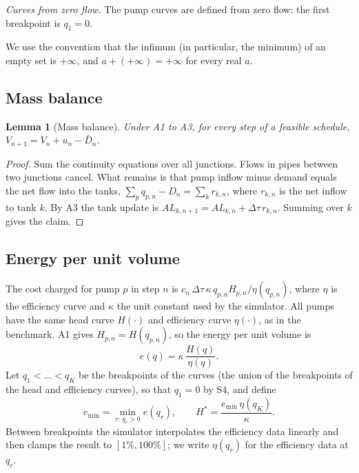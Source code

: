 \documentclass[11pt]{article}
\newtheorem{lemma}{Lemma}
\theoremstyle{remark}
\newenvironment{assumption}[2]
  {\begin{trivlist}\item[\hskip\labelsep(#1)]\emph{#2.}}
  {\end{trivlist}}
\newcommand{\dtau}{\Delta\tau}
\newcommand{\emin}{e_{\min}}
\begin{document}
\begin{assumption}{S4}{Curves from zero flow}
The pump curves are defined from zero flow: the first breakpoint is $q_1 = 0$.
\end{assumption}

We use the convention that the infimum (in particular, the minimum) of an empty set is
$+\infty$, and $a + (+\infty) = +\infty$ for every real $a$.

\subsection{Mass balance}\label{sec:mass}

\begin{lemma}[Mass balance]\label{lem:mass}
Under A1 to A3, for every step of a feasible schedule, $V_{n+1} = V_n + u_n - \bar D_n$.
\end{lemma}

\begin{proof}
Sum the continuity equations over all junctions. Flows in pipes between two junctions
cancel. What remains is that pump inflow minus demand equals the net flow into the tanks,
$\sum_p q_{p,n} - D_n = \sum_k r_{k,n}$, where $r_{k,n}$ is the net inflow to tank $k$.
By A3 the tank update is $A L_{k,n+1} = A L_{k,n} + \dtau\, r_{k,n}$. Summing over $k$
gives the claim.
\end{proof}

\subsection{Energy per unit volume}\label{sec:energy}

The cost charged for pump $p$ in step $n$ is
$c_n\, \dtau\, \kappa\, q_{p,n} H_{p,n} / \eta(q_{p,n})$, where $\eta$ is the efficiency
curve and $\kappa$ the unit constant used by the simulator. All pumps have the same head
curve $H(\cdot)$ and efficiency curve $\eta(\cdot)$, as in the benchmark. A1 gives $H_{p,n} = H(q_{p,n})$, so the energy per unit volume is
\[
  e(q) = \kappa\, \frac{H(q)}{\eta(q)}.
\]
Let $q_1 < \dots < q_K$ be the breakpoints of the curves (the union of the breakpoints of
the head and efficiency curves), so that $q_1 = 0$ by S4, and define
\[
  \emin = \min_{r :\, q_r > 0} e(q_r), \qquad H^* = \frac{\emin\, \eta(q_K)}{\kappa}.
\]
Between breakpoints the simulator interpolates the efficiency data linearly and then clamps
the result to $[1\%, 100\%]$; we write $\eta(q_r)$ for the efficiency data at $q_r$.
\end{document}
